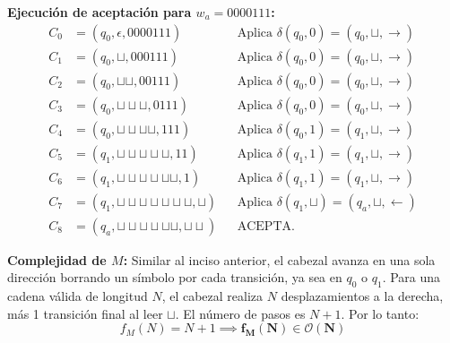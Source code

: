 \vspace{0.3cm}
\noindent\textbf{Ejecución de aceptación para $w_a = 0000111$:}
\begin{align*}
    C_0 &= (q_0, \epsilon, 0000111) && \text{Aplica } \delta(q_0, 0) = (q_0, \sqcup, \to) \\
    C_1 &= (q_0, \sqcup, 000111) && \text{Aplica } \delta(q_0, 0) = (q_0, \sqcup, \to) \\
    C_2 &= (q_0, \sqcup\sqcup, 00111) && \text{Aplica } \delta(q_0, 0) = (q_0, \sqcup, \to) \\
    C_3 &= (q_0, \sqcup\sqcup\sqcup, 0111) && \text{Aplica } \delta(q_0, 0) = (q_0, \sqcup, \to) \\
    C_4 &= (q_0, \sqcup\sqcup\sqcup\sqcup, 111) && \text{Aplica } \delta(q_0, 1) = (q_1, \sqcup, \to) \\
    C_5 &= (q_1, \sqcup\sqcup\sqcup\sqcup\sqcup, 11) && \text{Aplica } \delta(q_1, 1) = (q_1, \sqcup, \to) \\
    C_6 &= (q_1, \sqcup\sqcup\sqcup\sqcup\sqcup\sqcup, 1) && \text{Aplica } \delta(q_1, 1) = (q_1, \sqcup, \to) \\
    C_7 &= (q_1, \sqcup\sqcup\sqcup\sqcup\sqcup\sqcup\sqcup, \sqcup) && \text{Aplica } \delta(q_1, \sqcup) = (q_a, \sqcup, \leftarrow) \\
    C_8 &= (q_a, \sqcup\sqcup\sqcup\sqcup\sqcup\sqcup, \sqcup\sqcup) && \text{ACEPTA.}
\end{align*}

\textbf{Complejidad de $M$:} Similar al inciso anterior, el cabezal avanza en una sola dirección borrando un símbolo por cada transición, ya sea en $q_0$ o $q_1$. Para una cadena válida de longitud $N$, el cabezal realiza $N$ desplazamientos a la derecha, más 1 transición final al leer $\sqcup$. El número de pasos es $N + 1$. Por lo tanto:
\[ f_M(N) = N + 1 \implies \mathbf{f_M(N) \in \mathcal{O}(N)} \]